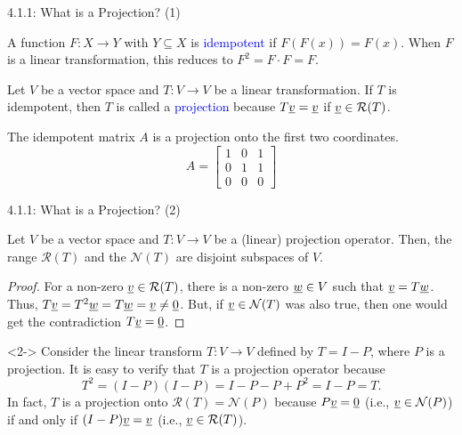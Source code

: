 \documentclass[10pt,english,aspectratio=169]{beamer}
\begin{document}
\begin{frame}{4.1.1: What is a Projection? (1)}

\begin{definition}
A function $F \colon X \rightarrow Y$ with $Y \subseteq X$ is \textcolor{blue}{idempotent} if $F(F(x))=F(x)$.  When $F$ is a linear transformation, this reduces to $F^2 = F \cdot F = F$.
\end{definition}

\begin{definition}
Let $V$ be a vector space and $T \colon V \rightarrow V$ be a linear transformation.
If $T$ is idempotent, then $T$ is called a \textcolor{blue}{projection} because $T\underline{v} = \underline{v}$ if $\underline{v} \in \mathcal{R}(T)$.
\end{definition}

\begin{example}
The idempotent matrix $A$ is a projection onto the first two coordinates. \vspace{-2mm}
\begin{equation*}
A = \begin{bmatrix}
1 & 0 & 1 \\
0 & 1 & 1 \\
0 & 0 & 0
\end{bmatrix}
\end{equation*}
\end{example}

\end{frame}

\begin{frame}{4.1.1:  What is a Projection? (2)}

\begin{theorem}
Let $V$ be a vector space and $T \colon V \rightarrow V$ be a (linear) projection operator.
Then, the range $\mathcal{R}(T)$ and the $\mathcal{N}(T)$ are disjoint subspaces of $V$.
\end{theorem}

\begin{proof}
For a non-zero $\underline{v} \in \mathcal{R}(T)$, there is a non-zero $\underline{w} \in V$ such that $\underline{v} = T\underline{w}$.  Thus, $T\underline{v} = T^2  \underline{w} = T \underline{w} = \underline{v} \neq \underline{0}$.  But, if $\underline{v} \in \mathcal{N}(T)$ was also true, then one would get the contradiction $T\underline{v} = \underline{0}$.
\end{proof}

\begin{example}<2->
Consider the linear transform $T \colon V \rightarrow V$ defined by $T = I - P$, where $P$ is a projection.
It is easy to verify that $T$ is a projection operator because \vspace{-2mm}
\[ T^2 = (I-P)(I-P) = I - P- P + P^2 = I-P = T .\]
In fact, $T$ is a projection onto $\mathcal{R}(T) = \mathcal{N}(P)$ because $P \underline{v} = \underline{0}$ (i.e., $\underline{v} \in \mathcal{N}(P)$) if and only if  $(I-P)\underline{v} = \underline{v}$ (i.e., $\underline{v} \in \mathcal{R}(T)$).
\end{example}

\end{frame}
\end{document}
